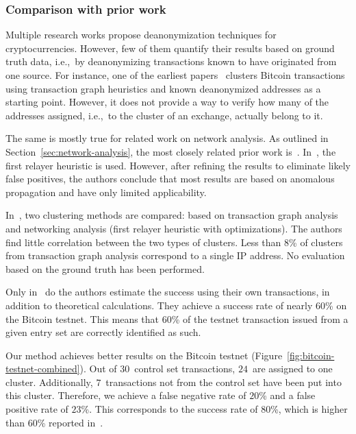 \subsubsection*{Comparison with prior work}

Multiple research works propose deanonymization techniques for cryptocurrencies.
However, few of them quantify their results based on ground truth data, i.e.,~by deanonymizing transactions known to have originated from one source.
For instance, one of the earliest papers~\cite{Meiklejohn2013} clusters Bitcoin transactions using transaction graph heuristics and known deanonymized addresses as a starting point.
However, it does not provide a way to verify how many of the addresses assigned, i.e.,~to the cluster of an exchange, actually belong to it.

The same is mostly true for related work on network analysis.
As outlined in Section~\ref{sec:network-analysis}, the most closely related prior work is~\cite{Koshy2014, Biryukov2014, Neudecker2017}.
In~\cite{Koshy2014}, the first relayer heuristic is used.
However, after refining the results to eliminate likely false positives, the authors conclude that most results are based on anomalous propagation and have only limited applicability.

In~\cite{Neudecker2017}, two clustering methods are compared: based on transaction graph analysis and networking analysis (first relayer heuristic with optimizations).
The authors find little correlation between the two types of clusters.
Less than $8$\% of clusters from transaction graph analysis correspond to a single IP address.
No evaluation based on the ground truth has been performed.

Only in~\cite{Biryukov2014} do the authors estimate the success using their own transactions, in addition to theoretical calculations.
They achieve a success rate of nearly $60$\% on the Bitcoin testnet.
This means that $60$\% of the testnet transaction issued from a given entry set are correctly identified as such.

Our method achieves better results on the Bitcoin testnet (Figure~\ref{fig:bitcoin-testnet-combined}).
Out of $30$~control set transactions, $24$~are assigned to one cluster.
Additionally, $7$~transactions not from the control set have been put into this cluster.
Therefore, we achieve a false negative rate of $20$\% and a false positive rate of $23$\%.
This corresponds to the success rate of $80$\%, which is higher than $60$\% reported in~\cite{Biryukov2014}.



